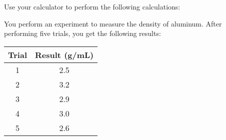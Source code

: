 \documentclass[11pt]{exam}
\begin{document}
\begin{questions}
\begin{multicols}{2}
  \end{multicols}


  \pagebreak


  \question 
    Use your calculator to perform the following calculations:

  \begin{multicols}{2}
  \end{multicols}

  \question
    You perform an experiment to measure the density of
    aluminum.  After performing five trials, you get the
    following results:
    \begin{center}
      \begin{tabular}{cc}
        \hline
        \bf Trial & {\bf Result} (g/mL) \\
        \hline
          1       &   2.5               \\
          2       &   3.2               \\
          3       &   2.9               \\
          4       &   3.0               \\
          5       &   2.6               \\
        \hline \hline
      \end{tabular}

      \begin{parts}


\end{parts}
\end{center}
\end{questions}
\end{document}
